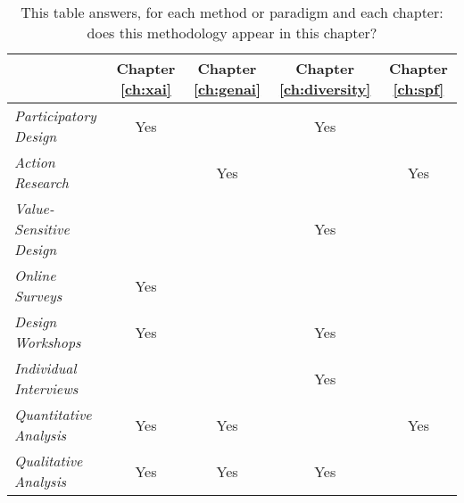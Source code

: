 \begin{table}[htbp]
    \centering
    \begin{tabular}{|l|c|c|c|c|}
    \hline
    & \textbf{Chapter \ref{ch:xai}} & \textbf{Chapter \ref{ch:genai}} & \textbf{Chapter \ref{ch:diversity}} & \textbf{Chapter \ref{ch:spf}} \\
    \hline
    \textit{Participatory Design} & Yes & & Yes & \\ 
    \textit{Action Research} & & Yes & & Yes \\ 
    \textit{Value-Sensitive Design} & & & Yes & \\ 
    \hline
    \textit{Online Surveys} & Yes & & & \\ 
    \textit{Design Workshops} & Yes & & Yes & \\ 
    \textit{Individual Interviews} & & & Yes & \\ 
    \textit{Quantitative Analysis} & Yes & Yes & & Yes \\ 
    \textit{Qualitative Analysis} & Yes & Yes & Yes & \\
    \hline
    \end{tabular}
    \caption{This table answers, for each method or paradigm and each chapter: does this methodology appear in this chapter?}
    \label{tab:method_subsections}
\end{table}
